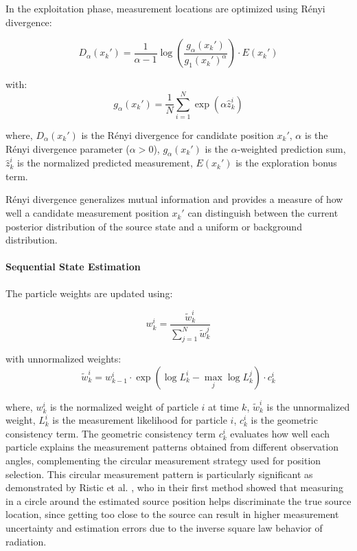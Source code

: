 \documentclass[../report.tex]{subfiles}
\begin{document}
    In the exploitation phase, measurement locations are optimized using Rényi divergence:

    \begin{equation}
    D_\alpha(x_k') = \frac{1}{\alpha-1} \log\left(\frac{g_\alpha(x_k')}{g_1(x_k')^\alpha}\right) \cdot E(x_k')
    \end{equation}

    with:
    \begin{equation}
    g_\alpha(x_k') = \frac{1}{N}\sum_{i=1}^N \exp(\alpha \hat{z}_k^i)
    \end{equation}

    where, $D_\alpha(x_k')$ is the Rényi divergence for candidate position $x_k'$, $\alpha$ is the Rényi divergence parameter ($\alpha > 0$), $g_\alpha(x_k')$ is the $\alpha$-weighted prediction 
    sum, $\hat{z}_k^i$ is the normalized predicted measurement, $E(x_k')$ is the exploration bonus term. 

    Rényi divergence generalizes mutual information and provides a measure of how well a candidate measurement position $x_k'$ can distinguish between the current posterior distribution of the source state and a uniform or background distribution.

    \paragraph{Sequential State Estimation}
    The particle weights are updated using:

    \begin{equation}
    w_k^i = \frac{\tilde{w}_k^i}{\sum_{j=1}^N \tilde{w}_k^j}
    \end{equation}

    with unnormalized weights:
    \begin{equation}
    \tilde{w}_k^i = w_{k-1}^i \cdot \exp(\log L_k^i - \max_j \log L_k^j) \cdot c_k^i
    \end{equation}

    where, $w_k^i$ is the normalized weight of particle $i$ at time $k$, $\tilde{w}_k^i$ is the unnormalized weight, $L_k^i$ is the measurement likelihood for particle $i$, $c_k^i$ is the geometric 
    consistency term. The geometric consistency term $c_k^i$ evaluates how well each particle explains the measurement patterns obtained from different observation angles, complementing the circular 
    measurement strategy used for position selection. This circular measurement pattern is particularly significant as demonstrated by Ristic et al. \cite{Ristic2007AnIG}, who in their first 
    method showed that measuring in a circle around the estimated source position helps discriminate the true source location, since getting too close to the source can result in higher 
    measurement uncertainty and estimation errors due to the inverse square law behavior of radiation.
\end{document}

